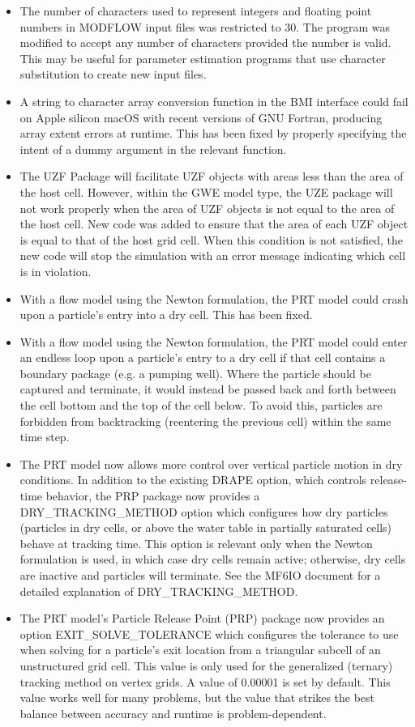 \begin{itemize}
    \item The number of characters used to represent integers and floating point numbers in MODFLOW input files was restricted to 30.  The program was modified to accept any number of characters provided the number is valid.  This may be useful for parameter estimation programs that use character substitution to create new input files.
    \item A string to character array conversion function in the BMI interface could fail on Apple silicon macOS with recent versions of GNU Fortran, producing array extent errors at runtime. This has been fixed by properly specifying the intent of a dummy argument in the relevant function.
    \item The UZF Package will facilitate UZF objects with areas less than the area of the host cell.  However, within the GWE model type, the UZE package will not work properly when the area of UZF objects is not equal to the area of the host cell.  New code was added to ensure that the area of each UZF object is equal to that of the host grid cell.  When this condition is not satisfied, the new code will stop the simulation with an error message indicating which cell is in violation.
    \item With a flow model using the Newton formulation, the PRT model could crash upon a particle's entry into a dry cell. This has been fixed.
    \item With a flow model using the Newton formulation, the PRT model could enter an endless loop upon a particle's entry to a dry cell if that cell contains a boundary package (e.g. a pumping well). Where the particle should be captured and terminate, it would instead be passed back and forth between the cell bottom and the top of the cell below. To avoid this, particles are forbidden from backtracking (reentering the previous cell) within the same time step.
    \item The PRT model now allows more control over vertical particle motion in dry conditions. In addition to the existing DRAPE option, which controls release-time behavior, the PRP package now provides a DRY\_TRACKING\_METHOD option which configures how dry particles (particles in dry cells, or above the water table in partially saturated cells) behave at tracking time. This option is relevant only when the Newton formulation is used, in which case dry cells remain active; otherwise, dry cells are inactive and particles will terminate. See the MF6IO document for a detailed explanation of DRY\_TRACKING\_METHOD.
    \item The PRT model's Particle Release Point (PRP) package now provides an option EXIT\_SOLVE\_TOLERANCE which configures the tolerance to use when solving for a particle's exit location from a triangular subcell of an unstructured grid cell. This value is only used for the generalized (ternary) tracking method on vertex grids. A value of 0.00001 is set by default. This value works well for many problems, but the value that strikes the best balance between accuracy and runtime is problem-dependent.

\end{itemize}

